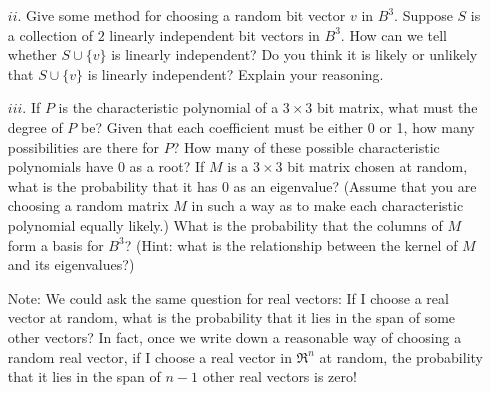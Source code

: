 \begin{enumerate}
\begin{itemize}
\item[$ii.$] Give some method for choosing a random bit vector $v$ in \(B^3\).  Suppose $S$ is a collection of $2$ linearly independent bit vectors in $B^3$.  How can we tell whether $S\cup \{v\}$ is linearly independent?  Do you think it is likely or unlikely that $S\cup \{v\}$ is linearly independent?  Explain your reasoning.

\item[$iii.$] If \(P\) is the characteristic polynomial of a \(3 \times 3\) bit matrix, what must the degree of \(P\) be? Given that each coefficient must be either 0 or 1, how many possibilities are there for \(P\)? How many of these possible characteristic polynomials have 0 as a root? If \(M\) is a \(3 \times 3\) bit matrix chosen at random, what is the probability that it has 0 as an eigenvalue? (Assume that you are choosing a random matrix \(M\) in such a way as to make each characteristic polynomial equally likely.) What is the probability that the columns of \(M\) form a basis for \(B^3\)? (Hint: what is the relationship between the kernel of \(M\) and its eigenvalues?)

\item[Note:] We could ask the same question for real vectors: If I choose a real vector at random, what is the probability that it lies in the span of some other vectors? In fact, once we write down a reasonable way of choosing a random real vector, if I choose a real vector in \(\Re^n\) at random, the probability that it lies in the span of \(n-1\) other real vectors is zero! 
\end{itemize}

\end{enumerate}


